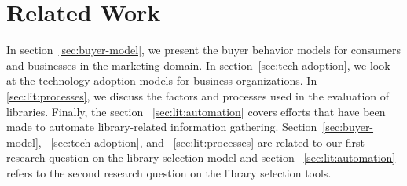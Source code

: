 


\section{Related Work}
  In section~\ref{sec:buyer-model}, we present the buyer behavior models for consumers and businesses in the marketing domain.
  In section~\ref{sec:tech-adoption}, we look at the technology adoption models for business organizations. In \sec\ref{sec:lit:processes}, 
  we discuss the factors and processes used in the evaluation of libraries.
  Finally, the section ~\ref{sec:lit:automation} covers efforts that have been made to automate library-related information gathering. 
  Section~\ref{sec:buyer-model}, ~\ref{sec:tech-adoption}, and ~\ref{sec:lit:processes} are related to our first research question on the library selection model and section ~\ref{sec:lit:automation} refers to the second research question on the library selection tools.
  
